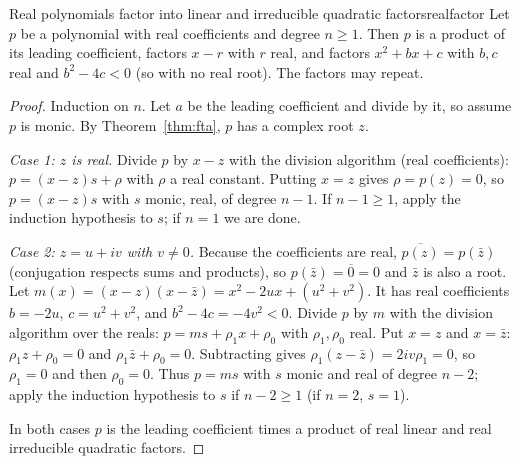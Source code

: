 \documentclass[11pt]{article}
\begin{document}
\begin{thm}{Real polynomials factor into linear and irreducible quadratic factors}{realfactor}
Let $p$ be a polynomial with real coefficients and degree $n\ge1$. Then $p$ is a product of its leading coefficient, factors $x-r$ with $r$ real, and factors $x^2+bx+c$ with $b,c$ real and $b^2-4c<0$ (so with no real root). The factors may repeat.
\end{thm}
\begin{proof}
Induction on $n$. Let $a$ be the leading coefficient and divide by it, so assume $p$ is monic. By Theorem~\ref{thm:fta}, $p$ has a complex root $z$.

\emph{Case 1: $z$ is real.} Divide $p$ by $x-z$ with the division algorithm (real coefficients): $p=(x-z)s+\rho$ with $\rho$ a real constant. Putting $x=z$ gives $\rho=p(z)=0$, so $p=(x-z)s$ with $s$ monic, real, of degree $n-1$. If $n-1\ge1$, apply the induction hypothesis to $s$; if $n=1$ we are done.

\emph{Case 2: $z=u+iv$ with $v\ne0$.} Because the coefficients are real, $\overline{p(z)}=p(\bar z)$ (conjugation respects sums and products), so $p(\bar z)=\overline0=0$ and $\bar z$ is also a root. Let $m(x)=(x-z)(x-\bar z)=x^2-2ux+\left(u^2+v^2\right)$. It has real coefficients $b=-2u$, $c=u^2+v^2$, and $b^2-4c=-4v^2<0$. Divide $p$ by $m$ with the division algorithm over the reals: $p=ms+\rho_1x+\rho_0$ with $\rho_1,\rho_0$ real. Put $x=z$ and $x=\bar z$: $\rho_1z+\rho_0=0$ and $\rho_1\bar z+\rho_0=0$. Subtracting gives $\rho_1(z-\bar z)=2iv\rho_1=0$, so $\rho_1=0$ and then $\rho_0=0$. Thus $p=ms$ with $s$ monic and real of degree $n-2$; apply the induction hypothesis to $s$ if $n-2\ge1$ (if $n=2$, $s=1$).

In both cases $p$ is the leading coefficient times a product of real linear and real irreducible quadratic factors.
\end{proof}
\end{document}
